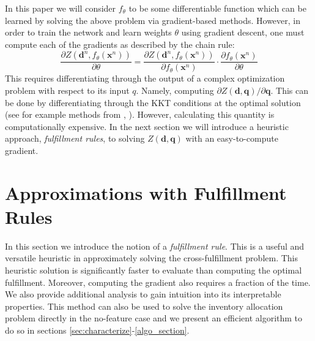 \documentclass[poms,final,blindrev]{poms1_V1} %
\newcommand{\x}[0]{{\mathbf{x}}}
\newcommand{\q}[0]{{\mathbf{q}}}
\newcommand{\dd}[0]{{\mathbf{d}}}
\renewcommand{\d}[0]{{\mathbf{d}}}
\begin{document}
In this paper we will consider $f_\theta$ to be some differentiable function which can be learned by solving the above problem via gradient-based methods. However, in order to train the network and learn weights $\theta$ using gradient descent, one must compute each of the gradients as described by the chain rule:
\begin{equation}
    \frac{\partial Z(\dd^n, f_\theta(\x^n))}{\partial \theta} = \frac{\partial Z(\dd^n, f_\theta(\x^n))}{\partial f_\theta(\x^n)} \cdot \frac{\partial f_\theta(\x^n)}{\partial \theta}
\end{equation}
This requires differentiating through the output of a complex optimization problem with respect to its input $q$. Namely, computing $\partial Z(\d, \q) / \partial \q$. This can be done by differentiating through the KKT conditions at the optimal solution (see for example methods from \cite{optnet}, \cite{agrawal2019differentiable}). However, calculating this quantity is computationally expensive. In the next section we will introduce a heuristic approach, \emph{fulfillment rules}, to solving $Z(\d, \q)$ with an easy-to-compute gradient. 



\section{Approximations with Fulfillment Rules}

In this section we introduce the notion of a \emph{fulfillment rule}. This is a useful and versatile heuristic in approximately solving the cross-fulfillment problem. This heuristic solution is significantly faster to evaluate than computing the optimal fulfillment. Moreover, computing the gradient also requires a fraction of the time.  We also provide additional analysis to gain intuition into its interpretable properties. This method can also be used to solve the inventory allocation problem directly in the no-feature case and we present an efficient algorithm to do so in sections \ref{sec:characterize}-\ref{algo_section}.
\end{document}

